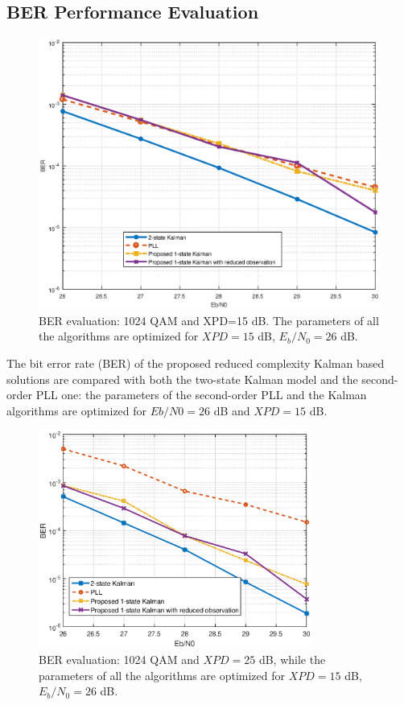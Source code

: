 \subsection{BER Performance Evaluation}
\label{PE}
\begin{figure}
	\includegraphics[width=1\textwidth]{figures/fig_red_kalman/Fig3.eps}
	\caption{BER evaluation: 1024 QAM and XPD=15 dB.
		The parameters of all the algorithms are optimized for $XPD=15$ dB, $E_b/N_0=26$ dB.}
	\label{fig3}      
\end{figure}
The bit error rate (BER) of the proposed reduced complexity Kalman based solutions are compared with both the two-state Kalman model and the second-order PLL one: the parameters of the second-order PLL and the
Kalman algorithms are optimized for $Eb/N0 = 26$ dB and $XPD=15$ dB.
\begin{figure}
	\includegraphics[width=0.8\textwidth]{figures/fig_red_kalman/Fig4.eps}
	\caption{BER evaluation: 1024 QAM and $XPD=25$ dB, while the parameters of all the algorithms are optimized for $XPD=15$ dB, $E_b/N_0=26$ dB.}
	\label{fig4}      
\end{figure}


